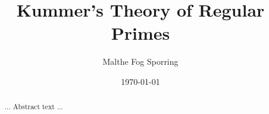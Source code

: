 \documentclass[12pt]{report}
\title{Kummer's Theory of Regular Primes}
\author{Malthe Fog Sporring}
\date{\today}
\numberwithin{thm}{section}
\theoremstyle{plain}
\theoremstyle{definition}
\begin{document}
\maketitle

\begin{abstract} ... Abstract text ... \end{abstract}
\declaration
\dedication{...dedication text...}
\tableofcontents
\newpage
{}





\newpage
\newpage
{}

\end{document}
